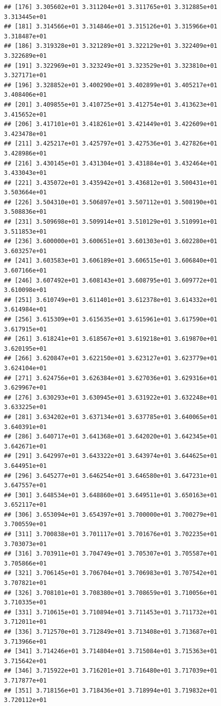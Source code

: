 \documentclass[]{book}
\theoremstyle{definition}
\theoremstyle{definition}
\theoremstyle{remark}
\begin{document}
\begin{verbatim}
## [176] 3.305602e+01 3.311204e+01 3.311765e+01 3.312885e+01 3.313445e+01
## [181] 3.314566e+01 3.314846e+01 3.315126e+01 3.315966e+01 3.318487e+01
## [186] 3.319328e+01 3.321289e+01 3.322129e+01 3.322409e+01 3.322689e+01
## [191] 3.322969e+01 3.323249e+01 3.323529e+01 3.323810e+01 3.327171e+01
## [196] 3.328852e+01 3.400290e+01 3.402899e+01 3.405217e+01 3.408406e+01
## [201] 3.409855e+01 3.410725e+01 3.412754e+01 3.413623e+01 3.415652e+01
## [206] 3.417101e+01 3.418261e+01 3.421449e+01 3.422609e+01 3.423478e+01
## [211] 3.425217e+01 3.425797e+01 3.427536e+01 3.427826e+01 3.428986e+01
## [216] 3.430145e+01 3.431304e+01 3.431884e+01 3.432464e+01 3.433043e+01
## [221] 3.435072e+01 3.435942e+01 3.436812e+01 3.500431e+01 3.503664e+01
## [226] 3.504310e+01 3.506897e+01 3.507112e+01 3.508190e+01 3.508836e+01
## [231] 3.509698e+01 3.509914e+01 3.510129e+01 3.510991e+01 3.511853e+01
## [236] 3.600000e+01 3.600651e+01 3.601303e+01 3.602280e+01 3.603257e+01
## [241] 3.603583e+01 3.606189e+01 3.606515e+01 3.606840e+01 3.607166e+01
## [246] 3.607492e+01 3.608143e+01 3.608795e+01 3.609772e+01 3.610098e+01
## [251] 3.610749e+01 3.611401e+01 3.612378e+01 3.614332e+01 3.614984e+01
## [256] 3.615309e+01 3.615635e+01 3.615961e+01 3.617590e+01 3.617915e+01
## [261] 3.618241e+01 3.618567e+01 3.619218e+01 3.619870e+01 3.620195e+01
## [266] 3.620847e+01 3.622150e+01 3.623127e+01 3.623779e+01 3.624104e+01
## [271] 3.624756e+01 3.626384e+01 3.627036e+01 3.629316e+01 3.629967e+01
## [276] 3.630293e+01 3.630945e+01 3.631922e+01 3.632248e+01 3.633225e+01
## [281] 3.634202e+01 3.637134e+01 3.637785e+01 3.640065e+01 3.640391e+01
## [286] 3.640717e+01 3.641368e+01 3.642020e+01 3.642345e+01 3.642671e+01
## [291] 3.642997e+01 3.643322e+01 3.643974e+01 3.644625e+01 3.644951e+01
## [296] 3.645277e+01 3.646254e+01 3.646580e+01 3.647231e+01 3.647557e+01
## [301] 3.648534e+01 3.648860e+01 3.649511e+01 3.650163e+01 3.652117e+01
## [306] 3.653094e+01 3.654397e+01 3.700000e+01 3.700279e+01 3.700559e+01
## [311] 3.700838e+01 3.701117e+01 3.701676e+01 3.702235e+01 3.703073e+01
## [316] 3.703911e+01 3.704749e+01 3.705307e+01 3.705587e+01 3.705866e+01
## [321] 3.706145e+01 3.706704e+01 3.706983e+01 3.707542e+01 3.707821e+01
## [326] 3.708101e+01 3.708380e+01 3.708659e+01 3.710056e+01 3.710335e+01
## [331] 3.710615e+01 3.710894e+01 3.711453e+01 3.711732e+01 3.712011e+01
## [336] 3.712570e+01 3.712849e+01 3.713408e+01 3.713687e+01 3.713966e+01
## [341] 3.714246e+01 3.714804e+01 3.715084e+01 3.715363e+01 3.715642e+01
## [346] 3.715922e+01 3.716201e+01 3.716480e+01 3.717039e+01 3.717877e+01
## [351] 3.718156e+01 3.718436e+01 3.718994e+01 3.719832e+01 3.720112e+01

\end{verbatim}
\end{document}
